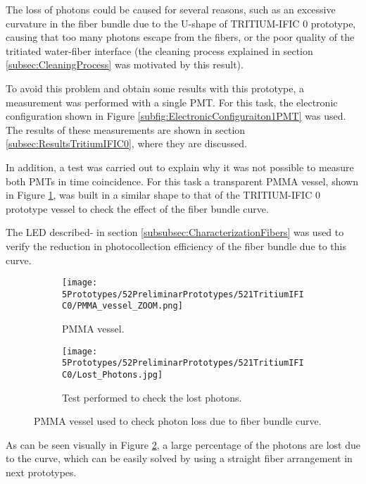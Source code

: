 The loss of photons could be caused for several reasons, such as an excessive curvature in the fiber bundle due to the U-shape of TRITIUM-IFIC 0 prototype, causing that too many photons escape from the fibers, or the poor quality of the tritiated water-fiber interface (the cleaning process explained in section \ref{subsec:CleaningProcess} was motivated by this result).

To avoid this problem and obtain some results with this prototype, a measurement was performed with a single PMT. For this task, the electronic configuration shown in Figure \ref{subfig:ElectronicConfiguraiton1PMT} was used. The results of these measurements are shown in section \ref{subsec:ResultsTritiumIFIC0}, where they are discussed.

In addition, a test was carried out to explain why it was not possible to measure both PMTs in time coincidence. For this task a transparent PMMA vessel, shown in Figure \ref{subfig:PMMAVesselToTestLostPhotons}, was built in a similar shape to that of the TRITIUM-IFIC 0 prototype vessel to check the effect of the fiber bundle curve. 

The LED described- in section \ref{subsubsec:CharacterizationFibers} was used to verify the reduction in photocollection efficiency of the fiber bundle due to this curve. 

\begin{figure}
\centering
    \begin{subfigure}[b]{0.45\textwidth}
    \centering
    \texttt{[image: 5Prototypes/52PreliminarPrototypes/521TritiumIFIC0/PMMA\_vessel\_ZOOM.png]}  
    \caption{PMMA vessel.\label{subfig:PMMAVesselToTestLostPhotons}}
    \end{subfigure}
    \hfill
    \begin{subfigure}[b]{0.45\textwidth}
    \centering
    \texttt{[image: 5Prototypes/52PreliminarPrototypes/521TritiumIFIC0/Lost\_Photons.jpg]}  
    \caption{Test performed to check the lost photons.\label{subfig:TestLostPhotons}}
    \end{subfigure}
 \caption{PMMA vessel used to check photon loss due to fiber bundle curve.}
 \label{fig:TestLostPhotons}
\end{figure}

As can be seen visually in Figure \ref{subfig:TestLostPhotons}, a large percentage of the photons are lost due to the curve, which can be easily solved by using a straight fiber arrangement in next prototypes.

